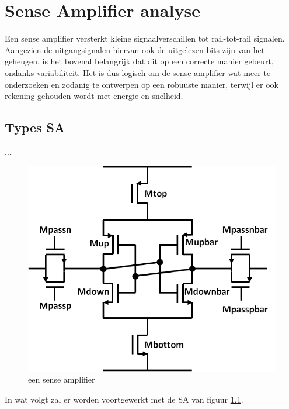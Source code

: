 \chapter{Sense Amplifier analyse}
\label{sensamp}
Een sense amplifier versterkt kleine signaalverschillen tot rail-tot-rail signalen. Aangezien de uitgangsignalen hiervan ook de uitgelezen bits zijn van het geheugen, is het bovenal belangrijk dat dit op een correcte manier gebeurt, ondanks variabiliteit.
Het is dus logisch om de sense amplifier wat meer te onderzoeken en zodanig te ontwerpen op een robuuste manier, terwijl er ook rekening gehouden wordt met energie en snelheid.

\section{Types SA}
...
\begin{figure}
  \centering
  \includegraphics[scale=0.4]{../fig/hfdstk-sensamp-ourSA.png}
  \caption{een sense amplifier}
  \label{fig:ourSA}
\end{figure}

In wat volgt zal er worden voortgewerkt met de SA van figuur \ref{fig:ourSA}.


